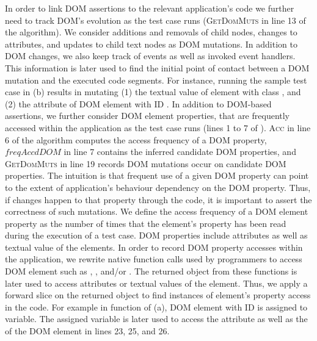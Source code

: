 In order to link DOM assertions to the relevant application's code we further need to track DOM's evolution as the test case runs (\textsc{GetDomMuts} in line 13 of the algorithm). 
We consider additions and removals of child nodes, changes to attributes, and updates to child text nodes as DOM mutations.
In addition to DOM changes, we also keep track of \javascript events as well as invoked event handlers. This information is later used to find the initial point of contact between a DOM mutation and the executed code segments.
For instance, running the sample test case in (b) results in mutating (1) the textual value of  element with class , and (2) the  attribute of DOM element with ID .
In addition to DOM-based assertions, we further consider DOM element properties, that are frequently accessed within the application as the test case runs (lines 1 to 7 of ). 
\textsc{Acc} in line 6 of the algorithm computes the access frequency of a DOM property, $freqAccdDOM$ in line 7 contains the inferred candidate DOM properties, and \textsc{GetDomMuts} in line 19 records DOM mutations occur
on candidate DOM properties.
The intuition is that frequent use of a given DOM property can point to the extent of application's behaviour dependency on the DOM property. Thus, if changes happen to that property through the \javascript code, it is important to assert the correctness of such mutations. We define the access frequency of a DOM element property as the number of times that the element's property has been read during the execution of a test case. DOM properties include attributes as well as textual value of the elements.
In order to record DOM property accesses within the application, we rewrite native function calls used by programmers to access DOM element such as , , and/or . The returned object from these functions is later used to access attributes or textual values of the element. Thus, we apply a forward slice on the returned object to find instances of element's property access in the code.
For example in function  of (a), DOM element with ID  is assigned to  variable. The assigned variable is later used to access the  attribute as well as the 
of the DOM element in lines 23, 25, and 26.

